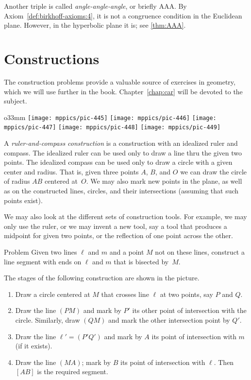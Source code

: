 Another triple is called {}\emph{angle-angle-angle}, or briefly AAA.
By Axiom~\ref{def:birkhoff-axioms:4}, it is not a congruence condition in the Euclidean plane.
However, in the hyperbolic plane it is; see \ref{thm:AAA}.

\section{Constructions}

The construction problems provide a valuable source of exercises in geometry,
which we will use further in the book.
Chapter~\ref{chap:car} will be devoted to the subject.

{

\begin{wrapfigure}{o}{33mm}
\vskip-8mm
\centering
\texttt{[image: mppics/pic-445]}
\bigskip
\texttt{[image: mppics/pic-446]}
\bigskip
\texttt{[image: mppics/pic-447]}
\bigskip
\texttt{[image: mppics/pic-448]}
\bigskip
\texttt{[image: mppics/pic-449]}
\end{wrapfigure}

A \emph{ruler-and-compass construction} is a construction with an idealized ruler and compass.
The idealized ruler can be used only to draw a line thru the given two points.
The idealized compass can be used only to draw a circle with a given center and radius.
That is, given three points $A$, $B$, and $O$
we can draw the circle of radius $AB$ centered at~$O$.
We may also mark new points in the plane,
as well as on the constructed lines, circles,
and their intersections (assuming that such points exist).

We may also look at the different sets of construction tools.
For example,
we may only use the ruler,
or we may invent a new tool,
say a tool that produces a midpoint for given two points,
or the reflection of one point across the other.

\begin{thm}{Problem}
Given two lines $\ell$ and $m$ and a point $M$ not on these lines,
construct a line segment with ends on $\ell$ and $m$ that is bisected by~$M$.
\end{thm}

The stages of the following construction are shown in the picture.

\begin{enumerate}[1.]
\item Draw a circle centered at $M$ that crosses line $\ell$ at two points, say $P$ and $Q$.
\item Draw the line $(PM)$ and mark by $P'$ its other point of intersection with the circle.
Similarly, draw $(QM)$ and mark the other intersection point by $Q'$.
\item Draw the line $\ell'=(P'Q')$ and mark by $A$ its point of intersection with $m$ (if it exists).
\item Draw the line $(MA)$;
mark by $B$ its point of intersection with $\ell$.
Then $[AB]$ is the required segment.
\end{enumerate}

}


